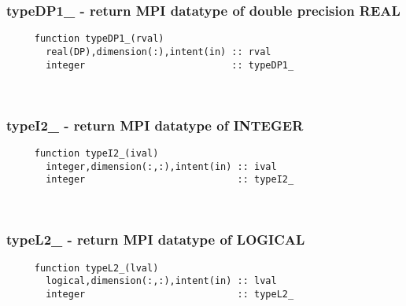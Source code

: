   \subsubsection{typeDP1\_ - return MPI datatype of double precision REAL}

\begin{verbatim} 
     function typeDP1_(rval)
       real(DP),dimension(:),intent(in) :: rval
       integer                          :: typeDP1_
 \end{verbatim}%
 
 
\mbox{}\hrulefill\ 
 
  \subsubsection{typeI2\_ - return MPI datatype of INTEGER}

\begin{verbatim} 
     function typeI2_(ival)
       integer,dimension(:,:),intent(in) :: ival
       integer                           :: typeI2_
 \end{verbatim}%
 
 
\mbox{}\hrulefill\ 
 
  \subsubsection{typeL2\_ - return MPI datatype of LOGICAL}

\begin{verbatim} 
     function typeL2_(lval)
       logical,dimension(:,:),intent(in) :: lval
       integer                           :: typeL2_
 \end{verbatim}%
 
